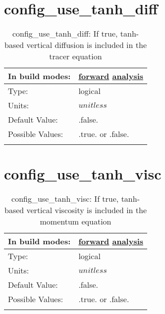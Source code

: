 \section[config\_use\_tanh\_diff]{config\_use\_tanh\_diff}
\label{sec:nm_sec_config_use_tanh_diff}
\begin{center}
\begin{longtable}{| p{2.0in} || p{4.0in} |}
    \hline
    In build modes: & \hyperref[subsec:forward_nm_tab_vmix_tanh]{forward} \hyperref[subsec:analysis_nm_tab_vmix_tanh]{analysis} \\
    \hline
    Type: & logical \\
    \hline
    Units: & $unitless$ \\
    \hline
    Default Value: & .false. \\
    \hline
    Possible Values: & .true. or .false. \\
    \hline
    \caption{config\_use\_tanh\_diff: If true, tanh-based vertical diffusion is included in the tracer equation}
\end{longtable}
\end{center}
\section[config\_use\_tanh\_visc]{config\_use\_tanh\_visc}
\label{sec:nm_sec_config_use_tanh_visc}
\begin{center}
\begin{longtable}{| p{2.0in} || p{4.0in} |}
    \hline
    In build modes: & \hyperref[subsec:forward_nm_tab_vmix_tanh]{forward} \hyperref[subsec:analysis_nm_tab_vmix_tanh]{analysis} \\
    \hline
    Type: & logical \\
    \hline
    Units: & $unitless$ \\
    \hline
    Default Value: & .false. \\
    \hline
    Possible Values: & .true. or .false. \\
    \hline
    \caption{config\_use\_tanh\_visc: If true, tanh-based vertical viscosity is included in the momentum equation}
\end{longtable}
\end{center}
